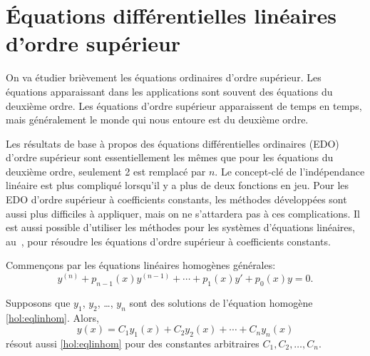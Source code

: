 \sectionnewpage
\section{Équations différentielles linéaires d'ordre supérieur} \label{sec:hol}


%

On va étudier brièvement les équations ordinaires d'ordre supérieur. Les équations apparaissant dans les applications sont souvent des équations du deuxième ordre. Les équations d'ordre supérieur apparaissent de temps en temps, mais généralement le monde qui nous entoure est du \og{}deuxième ordre\fg{}.  

Les résultats de base à propos des équations différentielles ordinaires (EDO) d'ordre supérieur sont essentiellement les mêmes que pour les équations du deuxième ordre, seulement 2 est remplacé par $n$.
Le concept-clé de l'indépendance linéaire est plus compliqué lorsqu'il y a plus de deux fonctions en jeu. Pour les EDO d'ordre supérieur à coefficients constants, les méthodes développées sont aussi plus difficiles à appliquer, mais on ne s'attardera pas à ces complications. Il est aussi possible d'utiliser les méthodes pour les systèmes d'équations linéaires, au~, pour résoudre les équations d'ordre supérieur à coefficients constants. 

Commençons par les équations linéaires homogènes générales: 
\begin{equation} \label{hol:eqlinhom}
	y^{(n)} + p_{n-1}(x)y^{(n-1)} + \cdots + p_1(x) y' + p_0(x) y = 0 .
\end{equation}

\begin{theorem}[Superposition]
	Supposons que $y_1$, $y_2$, \ldots, $y_n$ sont des solutions de l'équation homogène \eqref{hol:eqlinhom}.  
	Alors, 
	\begin{equation*}
		y(x) = C_1 y_1(x) + C_2 y_2(x) + \cdots + C_n y_n(x) 
	\end{equation*}
	résout aussi \eqref{hol:eqlinhom} pour des constantes arbitraires $C_1, C_2, \ldots, C_n$.
\end{theorem}

